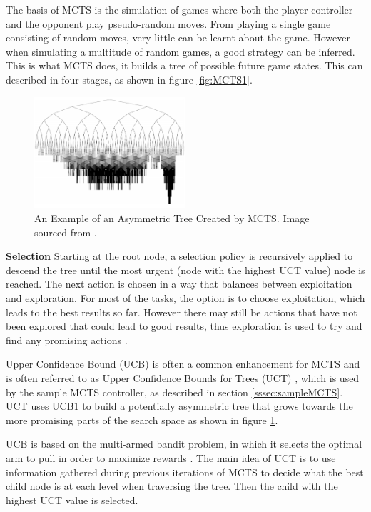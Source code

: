 \documentclass[journal]{IEEEtran}
\begin{document}
		The basis of MCTS is the simulation of games where both the player controller and the opponent play pseudo-random moves. From playing a single game consisting of random moves, very little can be learnt about the game. However when simulating a multitude of random games, a good strategy can be inferred. This is what MCTS does, it builds a tree of possible future game states. This can described in four stages, as shown in figure \ref{fig:MCTS1}.
				\begin{figure}[h]
		    \centering
		    \includegraphics[width=0.5\textwidth]{MCTSasymmetry}
		    \caption{An Example of an Asymmetric Tree Created by MCTS. Image sourced from \cite{coquelin2007bandit}. }
		    \label{fig:MCTS2}
		\end{figure}


		\textbf{Selection}
			Starting at the root node, a selection policy is recursively applied to descend the tree until the most urgent (node with the highest UCT value) node is reached. 
			The next action is chosen in a way that balances between exploitation and exploration. For most of the tasks, the option is to choose exploitation, which leads to the best results so far. However there may still be actions that have not been explored that could lead to good results, thus exploration is used to try and find any promising actions \cite{chaslot2008monte}.
			
			Upper Confidence Bound (UCB) is often a common enhancement for MCTS and is often referred to as Upper Confidence Bounds for Trees (UCT) \cite{bravi2017evolving}, which is used by the sample MCTS controller, as described in section \ref{sssec:sampleMCTS}. 
			UCT uses UCB1 to build a potentially asymmetric tree that grows towards the more promising parts of the search space as shown in figure \ref{fig:MCTS2}. 

			UCB is based on the multi-armed bandit problem, in which it selects the optimal arm to pull in order to maximize rewards \cite{kocsis2006bandit, browne2012survey, gelly2006modification}.
			The main idea of UCT is to use information gathered during previous iterations of MCTS to decide what the best child node is at each level when traversing the tree. Then the child with the highest UCT value is selected. 
			
\end{document}
